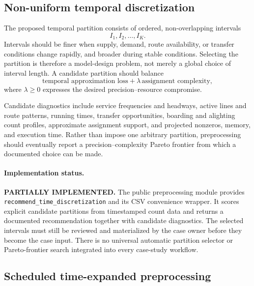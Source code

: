 \subsection{Non-uniform temporal discretization}

The proposed temporal partition consists of ordered, non-overlapping intervals
\begin{equation}
  I_1,I_2,\ldots,I_K.
\end{equation}
Intervals should be finer when supply, demand, route availability, or transfer
conditions change rapidly, and broader during stable conditions.  Selecting
the partition is therefore a model-design problem, not merely a global choice
of interval length.  A candidate partition should balance
\begin{equation}
  \text{temporal approximation loss}
  +\lambda\,\text{assignment complexity},
  \label{eq:temporal-partition-objective}
\end{equation}
where $\lambda\geq 0$ expresses the desired precision--resource compromise.

Candidate diagnostics include service frequencies and headways, active lines
and route patterns, running times, transfer opportunities, boarding and
alighting count profiles, approximate assignment support, and projected
nonzeros, memory, and execution time.  Rather than impose one arbitrary
partition, preprocessing should eventually report a precision--complexity
Pareto frontier from which a documented choice can be made.

\paragraph{Implementation status.}
\textbf{PARTIALLY IMPLEMENTED.}  The public preprocessing module provides
\texttt{recommend\_time\_discretization} and its CSV convenience wrapper.  It
scores explicit candidate partitions from timestamped count data and returns a
documented recommendation together with candidate diagnostics.  The selected
intervals must still be reviewed and materialized by the case owner before
they become the case input.  There is no universal automatic partition
selector or Pareto-frontier search integrated into every case-study workflow.

\subsection{Scheduled time-expanded preprocessing}


